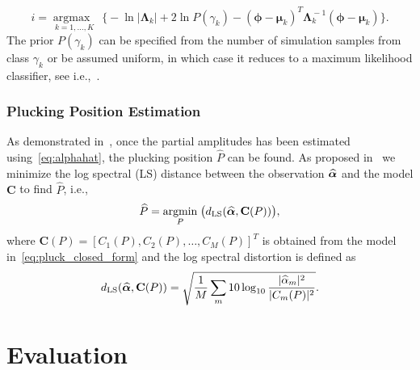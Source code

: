 \documentclass{article}
\begin{document}
\begin{sloppy}
\begin{equation}
  i\!=\!\underset{k=1,\dots,K}{\operatorname{argmax\!\!\!\!\!}}\;
\bigg\{\!\!\! -\!\ln \lvert \boldsymbol{\Lambda}_k\! \rvert\! +\! 2 \!\ln P(\!\gamma_k\!) \!-\! (\boldsymbol{\phi}-\boldsymbol{\mu}_k)^T \boldsymbol{\Lambda}_k^{\!-1} (\boldsymbol{\phi}-\boldsymbol{\mu}_k)    %
\!\!\bigg\}.
\end{equation}
%
The prior $P(\gamma_k)$ can be specified from the number of simulation samples from class $\gamma_k$ or be assumed uniform, in which case it reduces to a maximum likelihood classifier, see i.e.,~\cite{mspr}.
%
\vspace{-.8mm}
\subsubsection{Plucking Position Estimation} %
\label{sec:proposed_estimation_of_pluck_amplitude}
\vspace{-.6mm}
As demonstrated in~\cite{hjerrild::icassp19}, once the partial amplitudes has been estimated using~\eqref{eq:alphahat}, the plucking position $\widehat{P}$ can be found. As proposed in~\cite{hjerrild::icassp19} we minimize the log spectral (LS) distance between the observation $\text{\boldmath${\widehat\alpha}$}$ and the model $\mathbf{C}$ to find $\widehat{P}$, i.e., 
\begin{equation}
    \widehat{P} = \underset{P}{\operatorname{argmin}}\;{\big(d_{\textup{LS}}(\text{\boldmath${\widehat\alpha}$},\mathbf{C}(P))\big)},
\end{equation}
where $\mathbf{C}(P) = [C_1(P),C_2(P),\dots,C_M(P)]^T$ is obtained from the model in~\eqref{eq:pluck_closed_form} and the log spectral distortion is defined as
\begin{equation}
    d_{\textup{LS}}(\text{\boldmath${\widehat\alpha}$},\mathbf{C}(P)) = \sqrt{ \frac{1}{M} \sum_m 10\log_{10} \frac{\lvert\widehat{\alpha}_m\rvert^2}{\lvert C_m(P)\rvert^2} }.
\end{equation} 
%
%
%
%
%
%
\section{Evaluation} %
\label{sec:experiments}

%
%
%
%
%
%

\end{sloppy}
\end{document}
